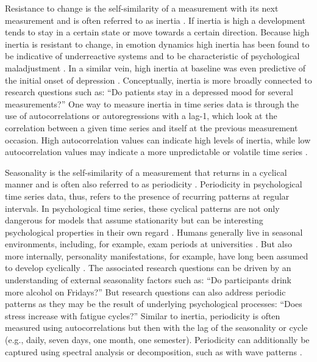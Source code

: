 \documentclass[man, 12pt, a4paper, mask, floatsintext]{apa7}
\theoremstyle{break}
\theoremstyle{plain}
\begin{document}
Resistance to change is the self-similarity of a measurement with its next measurement and is often referred to as inertia \citep{kuppens2010}. If inertia is high a development tends to stay in a certain state or move towards a certain direction. Because high inertia is resistant to change, in emotion dynamics high inertia has been found to be indicative of underreactive systems and to be characteristic of psychological maladjustment \citep{kuppens2010}. In a similar vein, high inertia at baseline was even predictive of the initial onset of depression \citep{kuppens2012}. Conceptually, inertia is more broadly connected to research questions such as: ``Do patients stay in a depressed mood for several measurements?'' One way to measure inertia in time series data is through the use of autocorrelations or autoregressions with a lag-1, which look at the correlation between a given time series and itself at the previous measurement occasion. High autocorrelation values can indicate high levels of inertia, while low autocorrelation values may indicate a more unpredictable or volatile time series \citep{dejonckheere2019}.

Seasonality is the self-similarity of a measurement that returns in a cyclical manner and is often also referred to as periodicity \citep{gregson1983}. Periodicity in psychological time series data, thus, refers to the presence of recurring patterns at regular intervals. In psychological time series, these cyclical patterns are not only dangerous for models that assume stationarity \citep{beal2015} but can be interesting psychological properties in their own regard \citep{epskamp2018, schmittmann2013}. Humans generally live in seasonal environments, including, for example, exam periods at universities \citep{fuller2003}. But also more internally, personality manifestations, for example, have long been assumed to develop cyclically \citep{cattell1957}. The associated research questions can be driven by an understanding of external seasonality factors such as: ``Do participants drink more alcohol on Fridays?'' But research questions can also address periodic patterns as they may be the result of underlying psychological processes: ``Does stress increase with fatigue cycles?'' Similar to inertia, periodicity is often measured using autocorrelations but then with the lag of the seasonality or cycle (e.g., daily, seven days, one month, one semester). Periodicity can additionally be captured using spectral analysis or decomposition, such as with wave patterns \citep[e.g., fourier or wavelet transformation; e.g.,][]{mayor2022}.
\end{document}
